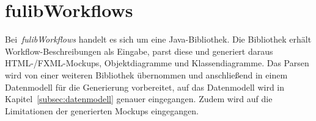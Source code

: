 \section{fulibWorkflows}\label{sec:fulibworkflows2}
Bei~\textit{fulibWorkflows} handelt es sich um eine Java-Bibliothek.
Die Bibliothek erhält Workflow-Beschreibungen als Eingabe, parst diese und generiert daraus HTML-/FXML-Mockups, Objektdiagramme und Klassendiagramme.
Das Parsen wird von einer weiteren Bibliothek übernommen und anschließend in einem Datenmodell für
die Generierung vorbereitet, auf das Datenmodell wird in Kapitel~\ref{subsec:datenmodell} genauer eingegangen.
Zudem wird auf die Limitationen der generierten Mockups eingegangen.








